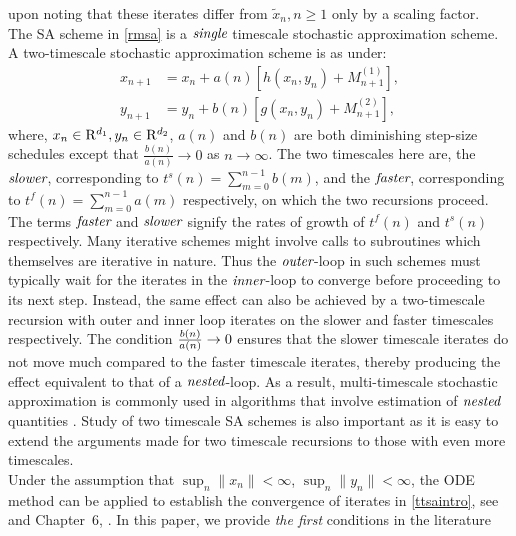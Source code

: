 upon noting that these iterates differ from $\tilde{x}_n,n\geq 1$ only by a scaling factor.\\
\indent The SA scheme in \eqref{rmsa} is a $\emph{single}$ timescale stochastic approximation scheme. 
A two-timescale stochastic approximation scheme \cite{TTSAP,BADA,SB-VB2,TTSPSA,BO,BTS} 
is as under:
\begin{subequations}\label{ttsaintro}
\begin{align}
\label{frec} x_{n+1}&=x_n+a(n)[h(x_n,y_n)+M^{(1)}_{n+1}],\\
\label{srec} y_{n+1}&=y_n+b(n)[g(x_n,y_n)+M^{(2)}_{n+1}], 
\end{align}
\end{subequations}
where, $x_n \in \mathrm{R}^{d_1}, y_n \in \mathrm{R}^{d_2}$, $a(n)$ and $b(n)$ are both diminishing step-size schedules 
except that $\frac{b(n)}{a(n)} \rightarrow 0$ as $n\rightarrow \infty$. 
The two timescales here are, the $\emph{slower}$, corresponding to $t^s(n)=\sum^{n-1}_{m=0} b(m)$, 
and the $\emph{faster}$,  corresponding to  $t^f(n)=\sum^{n-1}_{m=0} a(m)$ respectively, on which 
the two recursions proceed. The terms $\emph{faster}$ and $\emph{slower}$ signify the rates of growth 
of $t^f(n)$ and $t^s(n)$ respectively. Many iterative schemes might involve calls to subroutines which 
themselves are iterative in nature. Thus the $\emph{outer}$-loop in such schemes must typically wait for 
the iterates in the $\emph{inner}$-loop to converge before proceeding to its next step. 
Instead, the same effect can also be achieved by a two-timescale recursion with outer and inner loop 
iterates on the slower and faster timescales respectively. The condition $\frac{b(n)}{a(n)} \rightarrow 0$ 
ensures that the slower timescale iterates do not move much compared to the faster timescale iterates, 
thereby producing the effect equivalent to that of a $\emph{nested}$-loop. As a result,
multi-timescale stochastic approximation is commonly used in algorithms that involve estimation of 
$\emph{nested}$ quantities \cite{NAC,IAC,KAC,TTSAP,SB-VB2,BTS}. Study of two timescale SA schemes is 
also important as it is easy to extend the arguments made for two timescale recursions to those with 
even more timescales.\\
\indent Under the assumption that $\sup_n\parallel x_n\parallel <\infty$, $\sup_n\parallel y_n\parallel
<\infty$, the ODE method can 
be applied to establish the convergence of iterates in \eqref{ttsaintro}, see \cite{TTSAP} 
and Chapter~$6$, \cite{SA}. In this paper, we provide {\em the first} conditions in the literature

